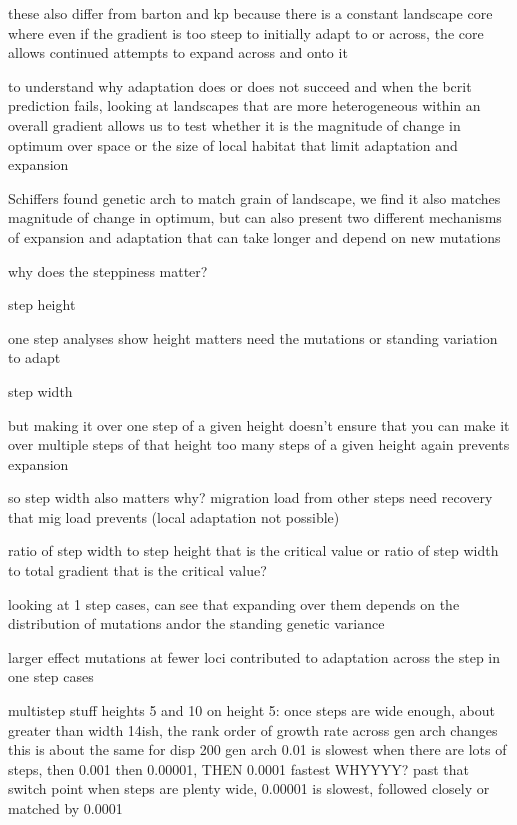 these also differ from barton and kp because there is a constant landscape core where even if the gradient is too steep to initially adapt to or across, the core allows continued attempts to expand across and onto it



to understand why adaptation does or does not succeed and when the bcrit prediction fails, looking at landscapes that are more heterogeneous within an overall gradient allows us to test whether it is the magnitude of change in optimum over space or the size of local habitat that limit adaptation and expansion



Schiffers found genetic arch to match grain of landscape, we find it also matches magnitude of change in optimum, but can also present two different mechanisms of expansion and adaptation that can take longer and depend on new mutations



why does the steppiness matter?

step height

	one step analyses show height matters
	need the mutations or standing variation to adapt


step width

	but making it over one step of a given height doesn't ensure that you can make it over multiple steps of that height
	too many steps of a given height again prevents expansion
	
	so step width also matters
		why?
		migration load from other steps
		need recovery that mig load prevents (local adaptation not possible)
		
		ratio of step width to step height that is the critical value
		or ratio of step width to total gradient that is the critical value?




looking at 1 step cases, can see that expanding over them depends on the distribution of mutations and\/or the standing genetic variance

larger effect mutations at fewer loci contributed to adaptation across the step in one step cases





multistep stuff heights 5 and 10
on height 5:
once steps are wide enough, about greater than width 14ish, the rank order of growth rate across gen arch changes
this is about the same for disp 200
gen arch 0.01 is slowest when there are lots of steps, then 0.001 then 0.00001, THEN 0.0001 fastest WHYYYY?
past that switch point when steps are plenty wide, 0.00001 is slowest, followed closely or matched by 0.0001

